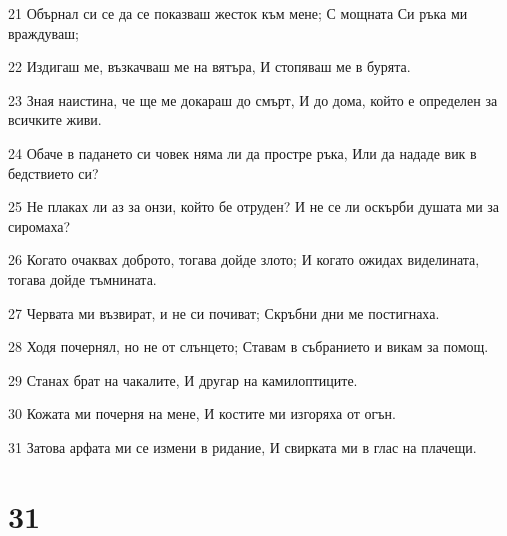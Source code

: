 \par 21 Обърнал си се да се показваш жесток към мене; С мощната Си ръка ми враждуваш;
\par 22 Издигаш ме, възкачваш ме на вятъра, И стопяваш ме в бурята.
\par 23 Зная наистина, че ще ме докараш до смърт, И до дома, който е определен за всичките живи.
\par 24 Обаче в падането си човек няма ли да простре ръка, Или да нададе вик в бедствието си?
\par 25 Не плаках ли аз за онзи, който бе отруден? И не се ли оскърби душата ми за сиромаха?
\par 26 Когато очаквах доброто, тогава дойде злото; И когато ожидах виделината, тогава дойде тъмнината.
\par 27 Червата ми възвират, и не си почиват; Скръбни дни ме постигнаха.
\par 28 Ходя почернял, но не от слънцето; Ставам в събранието и викам за помощ.
\par 29 Станах брат на чакалите, И другар на камилоптиците.
\par 30 Кожата ми почерня на мене, И костите ми изгоряха от огън.
\par 31 Затова арфата ми се измени в ридание, И свирката ми в глас на плачещи.

\chapter{31}


